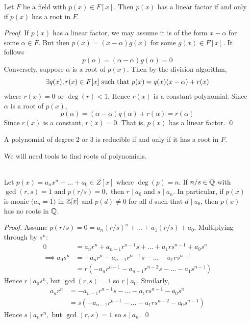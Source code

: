 \begin{proposition}
    Let $F$ be a field with $p(x) \in F[x]$. Then $p(x)$ has a linear factor if and only if $p(x)$ has a root in $F$.
\end{proposition}

\begin{proof}
    If $p(x)$ has a linear factor, we may assume it is of the form $x - \alpha$ for some $\alpha \in F$. But then $p(x) = (x-\alpha)g(x)$ for some $g(x) \in F[x]$. It follows
    $$p(\alpha) =(\alpha-\alpha)g(\alpha) = 0$$
    Conversely, suppose $\alpha$ is a root of $p(x)$. Then by the division algorithm,
    $$\exists q(x), r(x) \in F[x] \text{ such that } p(x) = q(x)(x-\alpha) + r(x)$$
    where $r(x) = 0$ or $\deg (r) < 1.$ Hence $r(x)$ is a constant polynomial. Since $\alpha$ is a root of $p(x)$,
    $$p(\alpha) = (\alpha - \alpha)q(\alpha) + r(\alpha) = r(\alpha)$$
    Since $r(x)$ is a constant, $r(x) = 0$. That is, $p(x)$ has a linear factor.
    \qed
\end{proof}

\begin{proposition}
    A polynomial of degree $2$ or $3$ is reducible if and only if it has a root in $F$.
\end{proposition}

We will need tools to find roots of polynomials.

\begin{theorem} \leavevmode \\
    Let $p(x) = a_nx^n+...+a_0 \in Z[x]$ where $\deg (p) = n$. If $n/s \in \mathbb{Q}$ with $\gcd(r,s) = 1$ and $p(r/s) = 0,$ then $r \mid a_0$ and $s \mid a_n$. In particular, if $p(x)$ is monic ($a_n = 1)$ in $\mathbb{Z}[x]$ and $p(d) \neq 0$ for all $d$ such that $d\mid a_0$, then $p(x)$ has no roots in $\mathbb{Q}$.
\end{theorem}

\begin{proof}
    Assume $p(r/s) = 0 = a_n(r/s)^n + ... + a_1(r/s) + a_0$. Multiplying through by $s^n:$
    \begin{align*}
        0 &= a_nr^n + a_{n-1}r^{n-1}s+...+a_1rs^{n-1}+a_0s^n \\
        \implies a_0s^n &= -a_nr^n -a_{n-1}r^{n-1}s -...-a_1rs^{n-1} \\
        &=r(-a_nr^{n-1}-a_{n-1}r^{n-2}s-...-a_1s^{n-1})
    \end{align*}
    Hence $r \mid a_0s^n$, but $\gcd(r,s) = 1$ so $r\mid a_0$. Similarly,
    \begin{align*}
        a_nr^n &= -a_{n-1}r^{n-1}s-... -a_1rs^{n-1}-a_0s^n \\
        &=s(-a_{n-1}r^{n-1}-...-a_1rs^{n-2}-a_0s^{n-1})
    \end{align*}
    Hence $s \mid a_nr^n,$ but $\gcd(r,s) = 1$ so $s \mid a_n.$
    \qed
\end{proof}

